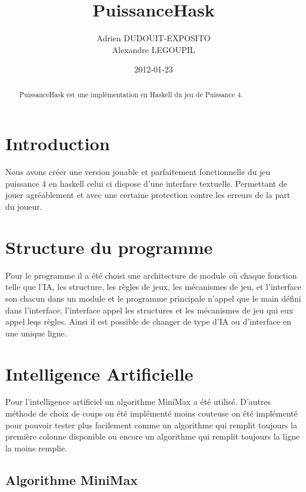 \documentclass[a4paper]{article}
\title{PuissanceHask}
\author{Adrien DUDOUIT-EXPOSITO\\Alexandre LEGOUPIL}
\date{2012-01-23}
\begin{document}
\ifpdf
{}
\else
{}
\fi

\maketitle


\begin{abstract}
PuissanceHask est une implémentation en Haskell du jeu de Puissance 4.
\end{abstract}
\section*{Introduction}
Nous avons créer une version jouable et parfaitement fonctionnelle du jeu puissance 4 en haskell celui ci dispose d'une interface textuelle. Permettant de jouer agréablement et avec une certaine protection contre les erreurs de la part du joueur.  
\newpage
\section{Structure du programme}

Pour le programme il a été choisi une architecture de module où chaque fonction telle que l'IA, les structure, les règles de jeux, les mécanismes de jeu, et l'interface son chacun dans un module et le programme principale n'appel que le main défini dans l'interface, l'interface appel les structures et les mécanismes de jeu qui eux appel leqs règles. Ainsi il est possible de changer de type d'IA ou d'interface en une unique ligne.

\section{Intelligence Artificielle}

Pour l'intelligence artificiel un algorithme MiniMax a été utilisé. D'autres méthode de choix de coups on été implémenté moins couteuse on été implémenté pour pouvoir tester plus facilement comme un algorithme qui remplit toujours la première colonne disponible ou encore un algorithme qui remplit toujours la ligne la moins remplie.

\subsection{Algorithme MiniMax}
\label{alg:minimax}
\end{document}
